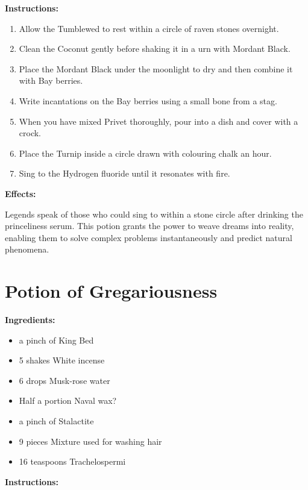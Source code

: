 \documentclass{article}
\begin{document}
\textbf{Instructions:}

\begin{enumerate}
  \item Allow the Tumblewed to rest within a circle of raven stones overnight.
  \item Clean the Coconut gently before shaking it in a urn with Mordant Black.
  \item Place the Mordant Black under the moonlight to dry and then combine it with Bay berries.
  \item Write incantations on the Bay berries using a small bone from a stag.
  \item When you have mixed Privet thoroughly, pour into a dish and cover with a crock.
  \item Place the Turnip inside a circle drawn with colouring chalk an hour.
  \item Sing to the Hydrogen fluoride until it resonates with fire.
\end{enumerate}

\textbf{Effects:}

Legends speak of those who could sing to within a stone circle after drinking the princeliness serum. This potion grants the power to weave dreams into reality, enabling them to solve complex problems instantaneously and predict natural phenomena.

\newpage
\section*{Potion of Gregariousness}

\textbf{Ingredients:}

\begin{itemize}
  \item a pinch of King Bed
  \item 5 shakes White incense
  \item 6 drops Musk-rose water
  \item Half a portion Naval wax?
  \item a pinch of Stalactite
  \item 9 pieces Mixture used for washing hair
  \item 16 teaspoons Trachelospermi
\end{itemize}

\textbf{Instructions:}
\end{document}
